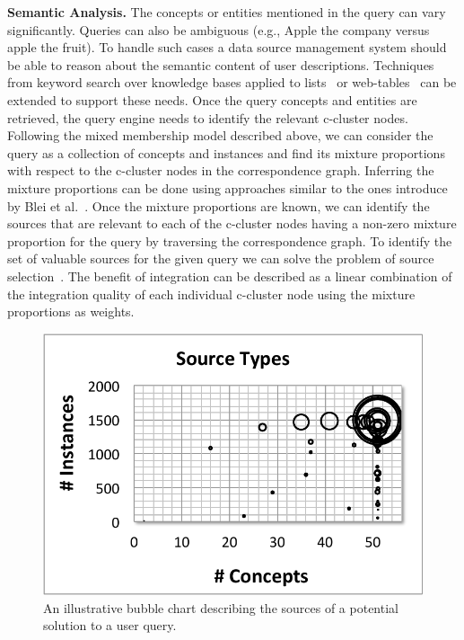 \documentclass{sig-alternate}
\begin{document}
\vspace{3pt}\noindent\textbf{Semantic Analysis.} The concepts or entities mentioned in the query can vary significantly. Queries can also be ambiguous (e.g., Apple the company versus apple the fruit). To handle such cases a data source management system should be able to reason about the semantic content of user descriptions. Techniques from keyword search over knowledge bases applied to lists~\cite{pimplikar:2012} or web-tables~\cite{dassarma:2012} can be extended to support these needs. Once the query concepts and entities are retrieved, the query engine needs to identify the relevant c-cluster nodes. Following the mixed membership model described above, we can consider the query as a collection of concepts and instances and find its mixture proportions with respect to the c-cluster nodes in the correspondence graph. Inferring the mixture proportions can be done using approaches similar to the ones introduce by Blei et al.~\cite{blei:2003}. Once the mixture proportions are known, we can identify the sources that are relevant to each of the c-cluster nodes having a non-zero mixture proportion for the query by traversing the correspondence graph. To identify the set of valuable sources for the given query we can solve the problem of source selection~\cite{dong:vldb13, rekatsinas:2014}. The benefit of integration can be described as a linear combination of the integration quality of each individual c-cluster node using the mixture proportions as weights.
\begin{figure}
	\begin{center}
	\includegraphics[clip,scale=0.44]{fig/sources.pdf}
	\vspace{-5pt}
	\caption{An illustrative bubble chart describing the sources of a potential solution to a user query.}
	\label{fig:bubble}
	\end{center}
	\vspace{-25pt}
\end{figure}
\end{document}
